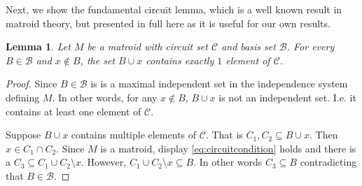 \documentclass[11pt]{article}
\newcommand{\sC}{\mathscr{C}}
\newcommand{\cC}{\mathcal{C}}
\newcommand{\sB}{\mathscr{B}}
\newcommand{\cB}{\mathcal{B}}
\newtheorem{lem}[thm]{Lemma}
\theoremstyle{remark}
\theoremstyle{definition}
\begin{document}
\begin{center}
\end{center}



Next, we show the fundamental circuit lemma, which is a well known result in matroid theory, but presented in full here as it is useful for our own results. 

\begin{lem}\label{res:fundamentalcircuit}
    Let $M$ be a matroid with circuit set $\sC$ and basis set $\sB$. For every $B \in \sB$ and $x \not \in B$, the set $B\cup x$ contains exactly $1$ element of $\sC$.
\end{lem}
\begin{proof}
    Since $B \in \sB$ is is a maximal independent set in the independence system defining $M$. In other words, for any $x \not \in B$, $B \cup x$ is not an independent set. I.e. it contains at least one element of $\sC$.

    Suppose $B \cup x$ contains multiple elements of $\sC$. That is $C_1, C_2 \subseteq B\cup x$. Then $x \in C_1 \cap C_2$. Since $M$ is a matroid, display \eqref{eq:circuitcondition} holds and there is a $C_3 \subseteq C_1 \cup C_2 \setminus x$. However,  $C_1 \cup C_2 \setminus x \subseteq B$. In other words $C_3 \subseteq B$ contradicting that $B \in \sB$.
\end{proof}

\end{document}
